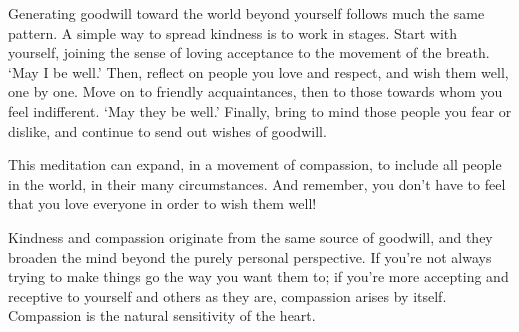 Generating goodwill toward the world beyond yourself follows much the
same pattern. A simple way to spread kindness is to work in stages.
Start with yourself, joining the sense of loving acceptance to the
movement of the breath. `May I be well.' Then, reflect on people you
love and respect, and wish them well, one by one. Move on to friendly
acquaintances, then to those towards whom you feel indifferent. `May
they be well.' Finally, bring to mind those people you fear or dislike,
and continue to send out wishes of goodwill.

This meditation can expand, in a movement of compassion, to include all
people in the world, in their many circumstances. And remember, you
don't have to feel that you love everyone in order to wish them well!

Kindness and compassion originate from the same source of goodwill, and
they broaden the mind beyond the purely personal perspective. If you're
not always trying to make things go the way you want them to; if you're
more accepting and receptive to yourself and others as they are,
compassion arises by itself. Compassion is the natural sensitivity of
the heart.

